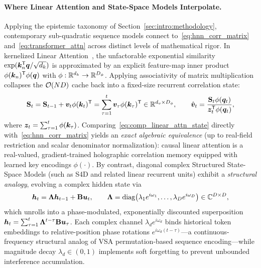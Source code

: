 \paragraph{Where Linear Attention and State-Space Models Interpolate.}
Applying the epistemic taxonomy of Section~\ref{sec:intro:methodology}, contemporary sub-quadratic sequence models connect to~\eqref{eq:hnn_corr_matrix} and~\eqref{eq:transformer_attn} across distinct levels of mathematical rigor.
In kernelized Linear Attention~\cite{KATHAROPOULOS_2020_LINEAR_TRANSFORMER}, the unfactorable exponential similarity $\exp(\boldsymbol{k}_n^{\mathsf{T}}\boldsymbol{q}/\sqrt{d_k})$ is approximated by an explicit feature-map inner product $\phi(\boldsymbol{k}_n)^{\mathsf{T}}\phi(\boldsymbol{q})$ with $\phi: \mathbb{R}^{d_k} \to \mathbb{R}^{D_\phi}$.
Applying associativity of matrix multiplication collapses the $\mathcal{O}\!\left(ND\right)$ cache back into a fixed-size recurrent correlation state:
\begin{equation}\label{eq:comp_linear_attn_state}
    \mathbf{S}_t = \mathbf{S}_{t-1} + \boldsymbol{v}_t \phi(\boldsymbol{k}_t)^{\mathsf{T}} = \sum_{\tau=1}^{t} \boldsymbol{v}_\tau \phi(\boldsymbol{k}_\tau)^{\mathsf{T}} \in \mathbb{R}^{d_v \times D_\phi},
    \qquad
    \hat{\boldsymbol{v}}_t = \frac{\mathbf{S}_t \phi(\boldsymbol{q}_t)}{\boldsymbol{z}_t^{\mathsf{T}} \phi(\boldsymbol{q}_t)},
\end{equation}
where $\boldsymbol{z}_t = \sum_{\tau=1}^t \phi(\boldsymbol{k}_\tau)$.
Comparing~\eqref{eq:comp_linear_attn_state} directly with~\eqref{eq:hnn_corr_matrix} yields an \emph{exact algebraic equivalence} (up to real-field restriction and scalar denominator normalization): causal linear attention is a real-valued, gradient-trained holographic correlation memory equipped with learned key encodings $\phi(\cdot)$.
By contrast, diagonal complex Structured State-Space Models (such as S4D and related linear recurrent units) exhibit a \emph{structural analogy}, evolving a complex hidden state via
\begin{equation}\label{eq:comp_ssm_recurrence}
    \boldsymbol{h}_t = \mathbf{\Lambda}\boldsymbol{h}_{t-1} + \mathbf{B}\boldsymbol{u}_t,
    \qquad
    \mathbf{\Lambda} = \operatorname{diag}\!\left(\lambda_1 e^{i\omega_1}, \dots, \lambda_D e^{i\omega_D}\right) \in \mathbb{C}^{D \times D},
\end{equation}
which unrolls into a phase-modulated, exponentially discounted superposition $\boldsymbol{h}_t = \sum_{\tau=1}^t \mathbf{\Lambda}^{t-\tau}\mathbf{B}\boldsymbol{u}_\tau$.
Each complex channel $\lambda_d e^{i\omega_d}$ binds historical token embeddings to relative-position phase rotations $e^{i\omega_d(t-\tau)}$---a continuous-frequency structural analog of VSA permutation-based sequence encoding---while magnitude decay $\lambda_d \in (0, 1)$ implements soft forgetting to prevent unbounded interference accumulation.
